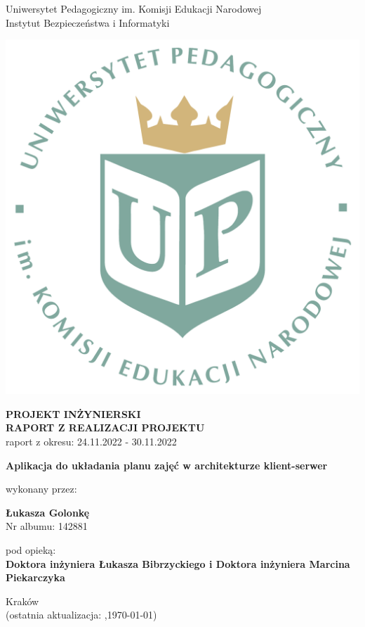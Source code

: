 \documentclass[12pt,a4paper,oneside]{article}
\theoremstyle{definition}
\numberwithin{equation}{section}
\begin{document}

\thispagestyle{empty}
\begin{titlepage}
\begin{center}\Large
Uniwersytet Pedagogiczny im. Komisji Edukacji Narodowej \\
\large
Instytut Bezpieczeństwa i Informatyki\\
\vskip 10pt
\end{center}
\begin{center}
\centering \includegraphics[width=0.4\columnwidth]{../resources/images/logoUP_pl.pdf}
\end{center}

\begin{center}
 {\bf \fontsize{14pt}{14pt}\selectfont PROJEKT INŻYNIERSKI \\ RAPORT Z REALIZACJI PROJEKTU\\
 }
 {\fontsize{12pt}{12pt} raport z okresu: 24.11.2022 - 30.11.2022}
\end{center}
\vskip 5pt
\begin{center}
 {\bf \fontsize{22pt}{22pt}\selectfont Aplikacja do układania planu zajęć w architekturze klient-serwer}
\end{center}

\begin{center}
 {\fontsize{12pt}{12pt}\selectfont wykonany przez: }
\end{center}
\begin{center}
 {\bf\fontsize{16pt}{16pt}\selectfont Łukasza Golonkę}\\
 {\fontsize{12pt}{12pt}\selectfont Nr albumu: 142881 \\}
\end{center}
\begin{center}
 {\fontsize{12pt}{12pt}\selectfont pod opieką:}\\
 {\bf\fontsize{12pt}{12pt}\selectfont Doktora inżyniera Łukasza Bibrzyckiego i Doktora inżyniera Marcina Piekarczyka}
\end{center}

\vspace*{\fill}
\begin{center}
\large
Kraków \the\year\\
(ostatnia aktualizacja: \DTMcurrenttime,\;\today)
\end{center}
\end{titlepage}
\setcounter{page}{0} 
\newpage\null\thispagestyle{empty}
\end{document}
